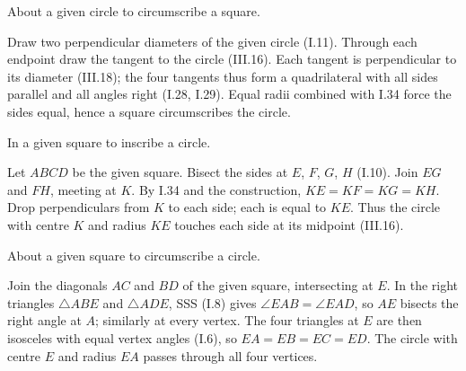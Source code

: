 \documentclass{rrxiv}
\begin{document}
\begin{claim}
\label{prop:IV.7}
About a given circle to circumscribe a square.
\end{claim}
\begin{evidence}[Proof of IV.7]
\label{ev:IV.7}
Draw two perpendicular diameters of the given circle (I.11).  Through
each endpoint draw the tangent to the circle (III.16).  Each tangent
is perpendicular to its diameter (III.18); the four tangents thus form
a quadrilateral with all sides parallel and all angles right (I.28,
I.29).  Equal radii combined with I.34 force the sides equal, hence a
square circumscribes the circle.
\end{evidence}

\begin{claim}
\label{prop:IV.8}
In a given square to inscribe a circle.
\end{claim}
\begin{evidence}[Proof of IV.8]
\label{ev:IV.8}
Let $ABCD$ be the given square.  Bisect the sides at $E$, $F$, $G$,
$H$ (I.10).  Join $EG$ and $FH$, meeting at $K$.  By I.34 and the
construction, $KE = KF = KG = KH$.  Drop perpendiculars from $K$ to
each side; each is equal to $KE$.  Thus the circle with centre $K$
and radius $KE$ touches each side at its midpoint (III.16).
\end{evidence}

\begin{claim}
\label{prop:IV.9}
About a given square to circumscribe a circle.
\end{claim}
\begin{evidence}[Proof of IV.9]
\label{ev:IV.9}
Join the diagonals $AC$ and $BD$ of the given square, intersecting
at $E$.  In the right triangles $\triangle ABE$ and $\triangle ADE$,
SSS (I.8) gives $\angle EAB = \angle EAD$, so $AE$ bisects the right
angle at $A$; similarly at every vertex.  The four triangles at $E$
are then isosceles with equal vertex angles (I.6), so $EA = EB = EC =
ED$.  The circle with centre $E$ and radius $EA$ passes through all
four vertices.
\end{evidence}
\end{document}
